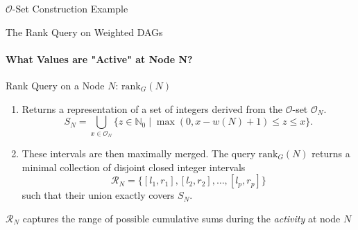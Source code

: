 \begin{frame}{$\mathcal{O}$-Set Construction Example}
\end{frame}

\begin{frame}{The Rank Query on Weighted DAGs}
    \framesubtitle{What Values are "Active" at Node N?}
    \begin{block}{Rank Query on a Node $N$: $\mathrm{rank}_G(N)$}
        \begin{enumerate}
            \item Returns a representation of a set of integers derived from the $\mathcal{O}$-set $\mathcal{O}_N$.
                  \[ S_N = \bigcup_{x \in \mathcal{O}_N} \{ z \in \mathbb{N}_0 \mid \max(0, x - w(N) + 1) \le z \le x \}. \]
                  \vspace{-1em}
                  \pause
            \item These intervals are then maximally merged. The query $\mathrm{rank}_G(N)$ returns a \alert{minimal collection of disjoint closed integer intervals}
                  \[ \mathcal{R}_N = \{[l_1, r_1], [l_2, r_2], \dots, [l_p, r_p]\} \]
                  such that their union exactly covers $S_N$.
        \end{enumerate}
    \end{block}
    $\mathcal{R}_N$ captures the range of possible cumulative sums during the \emph{activity} at node $N$

\end{frame}

